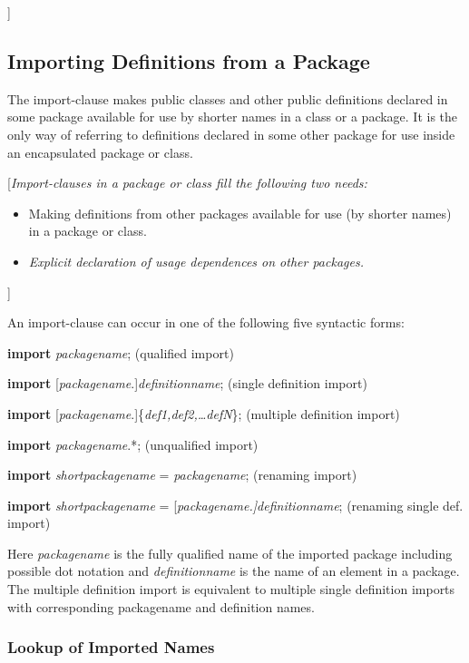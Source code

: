 \documentclass[../MLS.tex]{subfiles}
\begin{document}
{]}

\subsection{Importing Definitions from a Package}

The import-clause makes public classes and other public definitions
declared in some package available for use by shorter names in a class
or a package. It is the only way of referring to definitions declared in
some other package for use inside an encapsulated package or class.

{[}\emph{Import-clauses in a package or class fill the following two
needs:}

\begin{itemize}
\item
  Making definitions from other packages available for use (by shorter
  names) in a package or class.
\item
  \emph{Explicit declaration of usage dependences on other packages.}
\end{itemize}

{]}

An import-clause can occur in one of the following five syntactic forms:

\textbf{import} \emph{packagename}; (qualified import)

\textbf{import} {[}\emph{packagename}.{]}\emph{definitionname}; (single
definition import)

\textbf{import}
{[}\emph{packagename}.{]}\{\emph{def1,def2,\ldots{}defN}\}; (multiple
definition import)

\textbf{import} \emph{packagename}.*; (unqualified import)

\textbf{import} \emph{shortpackagename} = \emph{packagename}; (renaming
import)

\textbf{import} \emph{shortpackagename} =
{[}\emph{packagename.{]}definitionname}; (renaming single def. import)

Here \emph{packagename} is the fully qualified name of the imported
package including possible dot notation and \emph{definitionname} is the
name of an element in a package. The multiple definition import is
equivalent to multiple single definition imports with corresponding
packagename and definition names.

\subsubsection{Lookup of Imported Names}
\end{document}
